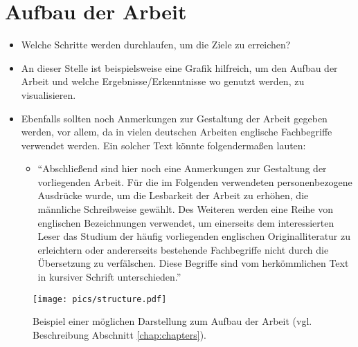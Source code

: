 \section{Aufbau der Arbeit}
\begin{itemize}
	\item Welche Schritte werden durchlaufen, um die Ziele zu erreichen?
	\item An dieser Stelle ist beispielsweise eine Grafik hilfreich, um den Aufbau der Arbeit und welche Ergebnisse/Erkenntnisse wo genutzt werden, zu visualisieren. 
	\item Ebenfalls sollten noch Anmerkungen zur Gestaltung der Arbeit gegeben werden, vor allem, da in vielen deutschen Arbeiten englische Fachbegriffe verwendet werden. Ein solcher Text könnte folgendermaßen lauten: 
		\begin{itemize}
			\item ``Abschließend sind hier noch eine Anmerkungen zur Gestaltung der vorliegenden Arbeit. Für die im Folgenden verwendeten personenbezogene Ausdrücke wurde, um die Lesbarkeit der Arbeit zu erhöhen, die männliche Schreibweise gewählt. Des Weiteren werden eine Reihe von englischen Bezeichnungen verwendet, um einerseits dem interessierten Leser das Studium der häufig vorliegenden englischen Originalliteratur zu erleichtern oder andererseits bestehende Fachbegriffe nicht durch die Übersetzung zu verfälschen. Diese Begriffe sind vom herkömmlichen Text in kursiver Schrift unterschieden.''
		\end{itemize}
\end{itemize}

\begin{figure}[!ht]
	\centering
		\texttt{[image: pics/structure.pdf]}
	\caption[Beispiel einer möglichen Darstellung zum Aufbau der Arbeit]{Beispiel einer möglichen Darstellung zum Aufbau der Arbeit (vgl. Beschreibung Abschnitt  \ref{chap:chapters}).} 
	\label{fig:structurethesis}
\end{figure}
